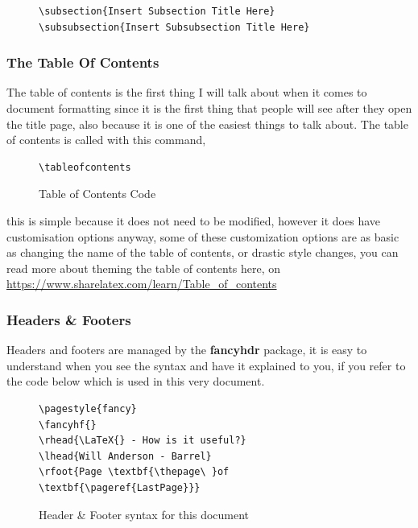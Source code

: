 \documentclass[12pt, letterpaper, oneside]{article} \usepackage[utf8]{inputenc}
\begin{document}
\begin{figure}[H]
\begin{lstlisting}
\subsection{Insert Subsection Title Here}
\subsubsection{Insert Subsubsection Title Here}
\end{lstlisting}
\end{figure}



\subsubsection{The Table Of Contents}

The table of contents is the first thing I will talk about when it comes to document formatting since it is the first thing that people will see after they open the title page, also because it is one of the easiest things to talk about.
The table of contents is called with this command,

\begin{minipage}{\linewidth}%
 \begin{figure}[H]
\begin{lstlisting}
\tableofcontents
\end{lstlisting}
	\caption{Table of Contents Code}
\end{figure}
\end{minipage}
this is simple because it does not need to be modified, however it does have customisation options anyway, some of these customization options are as basic as changing the name of the table of contents, or drastic style changes, you can read more about theming the table of contents here, on \href{ShareLaTeX}{https://www.sharelatex.com/learn/Table\_of\_contents}

\subsubsection{Headers \& Footers}

Headers and footers are managed by the \textbf{fancyhdr} package, it is easy to understand when you see the syntax and have it explained to you, if you refer to the code below which is used in this very document. 

\begin{figure}[H]
	\centering
	\begin{lstlisting}
\pagestyle{fancy}
\fancyhf{}
\rhead{\LaTeX{} - How is it useful?}
\lhead{Will Anderson - Barrel}
\rfoot{Page \textbf{\thepage\ }of \textbf{\pageref{LastPage}}}
\end{lstlisting}
	\caption{Header \& Footer syntax for this document}
\end{figure}
\end{document}
